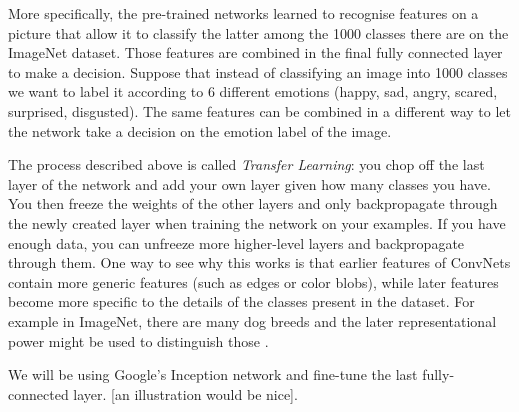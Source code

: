 More specifically, the pre-trained networks learned to recognise features on a picture that allow it to classify the latter among the 1000 classes there are on the ImageNet dataset. Those features are combined in the final fully connected layer to make a decision. Suppose that instead of classifying an image into 1000 classes we want to label it according to 6 different emotions (happy, sad, angry, scared, surprised, disgusted). The same features can be combined in a different way to let the network take a decision on the emotion label of the image.

The process described above is called {\em Transfer Learning}: you chop off the last layer of the network and add your own layer given how many classes you have. You then freeze the weights of the other layers and only backpropagate through the newly created layer when training the network on your examples. If you have enough data, you can unfreeze more higher-level layers and backpropagate through them. One way to see why this works is that earlier features of ConvNets contain more generic features (such as edges or color blobs), while later features become more specific to the details of the classes present in the dataset. For example in ImageNet, there are many dog breeds and the later representational power might be used to distinguish those \cite{transfer}.

We will be using Google's Inception network and fine-tune the last fully-connected layer. [an illustration would be nice].


